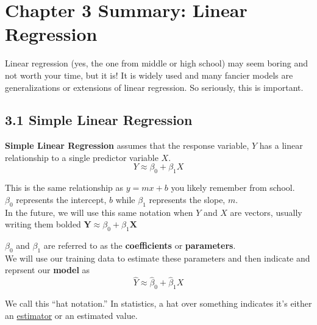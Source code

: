 

    \section*{Chapter 3 Summary: Linear    Regression}\label{chapter-3-summary-linear-regression}

        
        Linear regression (yes, the one from middle or high school) may seem boring and not worth your time, but it is! 
        It is widely used and many    fancier models are generalizations or extensions of linear regression.    So seriously, this is important.
        \subsection*{3.1 Simple Linear Regression}
        \textbf{Simple Linear Regression} assumes that the response variable,
        \(Y\) has a linear relationship to a single predictor variable \(X\). 
        \begin{equation*}
            Y \approx \beta_0 + \beta_1 X
        \end{equation*}
        
        
        \begin{note}
            This is the same relationship as \(y=mx+b\) you likely
            remember from school.\\
            \(\beta_0\) represents the intercept, \(b\) while \(\beta_1\) represents
            the slope, \(m\).\\
            In the future, we will use this same notation when \(Y\) and \(X\) are
            vectors, usually writing them bolded
            \(\mathbf{Y} \approx \beta_0 + \beta_1 \mathbf{X}\)
        \end{note}
        
        \(\beta_0\) and \(\beta_1\) are referred to as the \textbf{coefficients}
        or \textbf{parameters}.\\
        We will use our training data to estimate these parameters and then
        indicate and reprsent our \textbf{model} as 
        \begin{equation*}
            \hat Y \approx \hat \beta_0 + \hat \beta_1 X
        \end{equation*}

        \begin{note}
            We call this ``hat notation.'' In statistics, a hat over something indicates it's either an
            \href{https://en.wikipedia.org/wiki/Estimator}{estimator} or an estimated value.
        \end{note}
        
